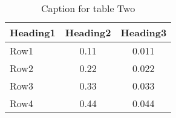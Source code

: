 \begin{table}[H]
\centering
\caption{Caption for table Two}
\label{tab:table2}
\begin{tabular}{@{}lcc@{}}
\toprule
\textbf{Heading1} & \textbf{Heading2} & \textbf{Heading3} \\ \midrule
Row1 & 0.11 & 0.011 \\
Row2 & 0.22 & 0.022 \\
Row3 & 0.33 & 0.033 \\
Row4 & 0.44 & 0.044 \\ \bottomrule
\end{tabular}
\end{table}